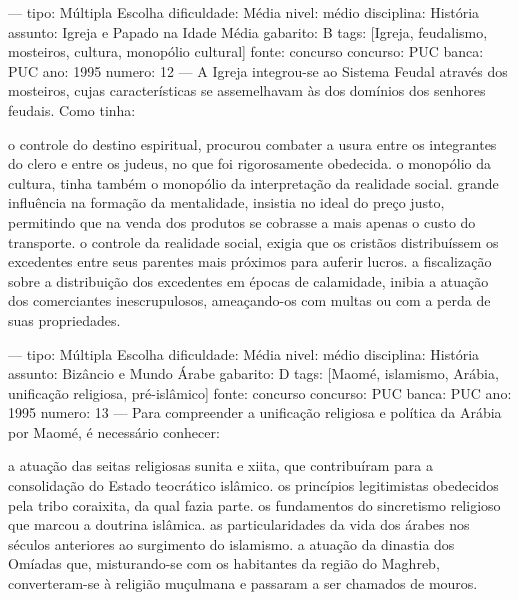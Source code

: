 ---
tipo: Múltipla Escolha
dificuldade: Média
nivel: médio
disciplina: História
assunto: Igreja e Papado na Idade Média
gabarito: B
tags: [Igreja, feudalismo, mosteiros, cultura, monopólio cultural]
fonte: concurso
concurso: PUC
banca: PUC
ano: 1995
numero: 12
---
\question
A Igreja integrou-se ao Sistema Feudal através dos mosteiros, cujas características se assemelhavam às dos domínios dos senhores feudais. Como tinha:
\begin{choices}
\choice o controle do destino espiritual, procurou combater a usura entre os integrantes do clero e entre os judeus, no que foi rigorosamente obedecida.
\CorrectChoice o monopólio da cultura, tinha também o monopólio da interpretação da realidade social.
\choice grande influência na formação da mentalidade, insistia no ideal do preço justo, permitindo que na venda dos produtos se cobrasse a mais apenas o custo do transporte.
\choice o controle da realidade social, exigia que os cristãos distribuíssem os excedentes entre seus parentes mais próximos para auferir lucros.
\choice a fiscalização sobre a distribuição dos excedentes em épocas de calamidade, inibia a atuação dos comerciantes inescrupulosos, ameaçando-os com multas ou com a perda de suas propriedades.
\end{choices}

---
tipo: Múltipla Escolha
dificuldade: Média
nivel: médio
disciplina: História
assunto: Bizâncio e Mundo Árabe
gabarito: D
tags: [Maomé, islamismo, Arábia, unificação religiosa, pré-islâmico]
fonte: concurso
concurso: PUC
banca: PUC
ano: 1995
numero: 13
---
\question
Para compreender a unificação religiosa e política da Arábia por Maomé, é necessário conhecer:
\begin{choices}
\choice a atuação das seitas religiosas sunita e xiita, que contribuíram para a consolidação do Estado teocrático islâmico.
\choice os princípios legitimistas obedecidos pela tribo coraixita, da qual fazia parte.
\choice os fundamentos do sincretismo religioso que marcou a doutrina islâmica.
\CorrectChoice as particularidades da vida dos árabes nos séculos anteriores ao surgimento do islamismo.
\choice a atuação da dinastia dos Omíadas que, misturando-se com os habitantes da região do Maghreb, converteram-se à religião muçulmana e passaram a ser chamados de mouros.
\end{choices}

